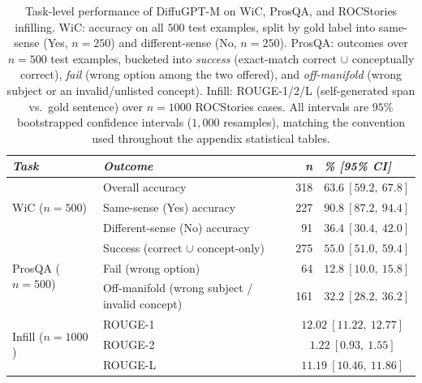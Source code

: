 \begin{table}[t]
\centering
\small
\caption{Task-level performance of DiffuGPT-M on WiC, ProsQA, and ROCStories infilling. WiC: accuracy on all $500$ test examples, split by gold label into same-sense (Yes, $n{=}250$) and different-sense (No, $n{=}250$). ProsQA: outcomes over $n{=}500$ test examples, bucketed into \emph{success} (exact-match correct $\cup$ conceptually correct), \emph{fail} (wrong option among the two offered), and \emph{off-manifold} (wrong subject or an invalid/unlisted concept). Infill: ROUGE-1/2/L (self-generated span vs.\ gold sentence) over $n{=}1000$ ROCStories cases. All intervals are $95\%$ bootstrapped confidence intervals ($1{,}000$ resamples), matching the convention used throughout the appendix statistical tables.}
\label{tab:task-performance}
\begin{tabular}{@{}llrl@{}}
\toprule
\textit{Task} & \textit{Outcome} & \textit{n} & \textit{\% [95\% CI]} \\
\midrule
\multirow[t]{3}{*}{WiC ($n{=}500$)}
& Overall accuracy & 318 & $63.6\ [59.2,\ 67.8]$ \\
& Same-sense (Yes) accuracy & 227 & $90.8\ [87.2,\ 94.4]$ \\
& Different-sense (No) accuracy & 91 & $36.4\ [30.4,\ 42.0]$ \\
\midrule
\multirow[t]{3}{*}{ProsQA ($n{=}500$)}
& Success (correct $\cup$ concept-only) & 275 & $55.0\ [51.0,\ 59.4]$ \\
& Fail (wrong option) & 64 & $12.8\ [10.0,\ 15.8]$ \\
& Off-manifold (wrong subject / invalid concept) & 161 & $32.2\ [28.2,\ 36.2]$ \\
\midrule
\multirow[t]{3}{*}{Infill ($n{=}1000$)}
& ROUGE-1 & \multicolumn{2}{c}{$12.02\ [11.22,\ 12.77]$} \\
& ROUGE-2 & \multicolumn{2}{c}{$1.22\ [0.93,\ 1.55]$} \\
& ROUGE-L & \multicolumn{2}{c}{$11.19\ [10.46,\ 11.86]$} \\
\bottomrule
\end{tabular}
\end{table}
